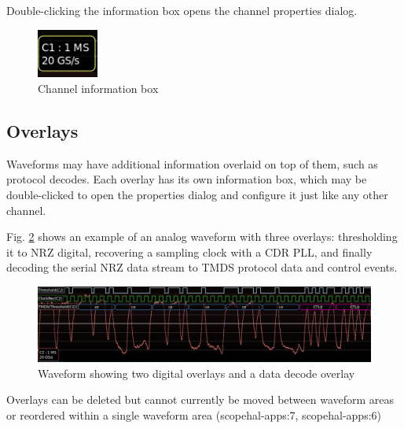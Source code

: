 Double-clicking the information box opens the channel properties dialog.

\begin{figure}[H]
\centering
\includegraphics[width=2cm]{images/channel-infobox.png}
\caption{Channel information box}
\label{channel-infobox}
\end{figure}

\subsection{Overlays}

Waveforms may have additional information overlaid on top of them, such as protocol decodes. Each overlay has its own
information box, which may be double-clicked to open the properties dialog and configure it just like any other
channel.

Fig. \ref{overlays} shows
an example of an analog waveform with three overlays: thresholding it to NRZ digital, recovering a sampling
clock with a CDR PLL, and finally decoding the serial NRZ data stream to TMDS protocol data and control events.

\begin{figure}[H]
\centering
\includegraphics[width=14cm]{images/overlays.png}
\caption{Waveform showing two digital overlays and a data decode overlay}
\label{overlays}
\end{figure}

Overlays can be deleted but cannot currently be moved between waveform areas or reordered within a single waveform area
(scopehal-apps:7, scopehal-apps:6)

